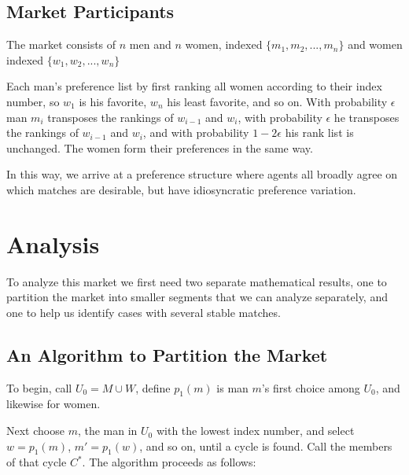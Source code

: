 \documentclass[WP]{AEA}
\begin{document}
\subsection{Market Participants}

The market consists of $n$ men and $n$ women,  indexed $\{ m_1, m_2, ... ,m_n\}$ and women indexed $\{ w_1, w_2, ... ,w_n\}$
	
Each man's preference list by first ranking all women according to their index number, so $w_1$ is his favorite, $w_n$ his least favorite, and so on.  
With probability $\epsilon$ man $m_i$ transposes the rankings of $w_{i-1}$ and $w_i$, with probability $\epsilon$ he transposes the rankings of $w_{i-1}$ and $w_i$, and with probability $1-2\epsilon$ his rank list is unchanged.
The women form their preferences in the same way.

In this way, we arrive at a preference structure where agents all broadly agree on which matches are desirable, but have idiosyncratic preference variation.
	


	
\section{Analysis}

To analyze this market we first need two separate mathematical results, one to partition the market into smaller segments that we can analyze separately, and one to help us identify cases with several stable matches.


\subsection{An Algorithm to Partition the Market} \label{subsect:partition}

To begin, call $U_0 = M \cup W$, define $p_1(m)$ is man $m$'s first choice among $U_0$, and likewise for women.

Next choose $m$, the man in $U_0$ with the lowest index number, and select $w = p_1(m)$, $m' = p_1(w)$, and so on, until a cycle is found. Call the members of that cycle $C^*$.  The algorithm proceeds as follows: 
\end{document}
